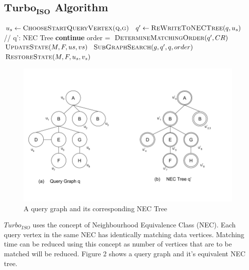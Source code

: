 \documentclass[
10pt, %
a4paper, %
oneside, %
headinclude,footinclude, %
BCOR5mm, %
]{scrartcl}
\begin{document}
\subsection{$\boldsymbol{Turbo_{ISO}}$ Algorithm\cite{turbo}}

\begin{algorithm}
\caption{\textsc{$Turbo_{ISO}(g,q)$}}\label{euclid}
\begin{algorithmic}[1]
\State $u_s \gets \textsc{ChooseStartQueryVertex(q,g)}$
\State $q' \gets \textsc{ReWriteToNECTree}(q,u_s)$ // q': NEC Tree
        \State \textbf{continue}
    \EndIf
    \State order = $\textsc{DetermineMatchingOrder}(q',CR)$
    \State $\textsc{UpdateState}(M,F,{us},{vs})$
    \State $\textsc{SubGraphSearch}(g,q',q,order)$
    \State $\textsc{RestoreState}(M,F,{u_s},{v_s})$
\EndFor
\end{algorithmic}
\end{algorithm}

\begin{figure}[H]
\centering 
\includegraphics[scale=0.5]{Figures/123.png} 
\caption[Query graph and NEC Tree]{A query graph and its corresponding NEC Tree} %
\label{fig:gallery} 
\end{figure}


$Turbo_{ISO}$ uses the concept of Neighbourhood Equivalence Class (NEC). Each query vertex in the same NEC has identically matching data vertices. Matching time can be reduced using this concept as number of vertices that are to be matched will be reduced. Figure 2 shows a query graph and it's equivalent NEC tree.
\end{document}
